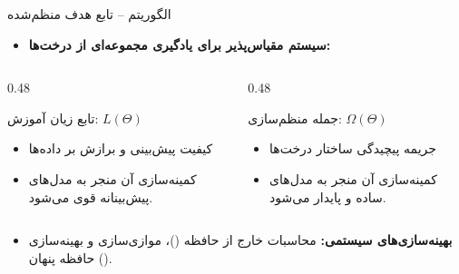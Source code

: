\begin{frame}{الگوریتم  -- تابع هدف منظم‌شده}{}
  \begin{itemize}
    \item \textbf{سیستم مقیاس‌پذیر برای یادگیری مجموعه‌ای از درخت‌ها:}
  \end{itemize}
  \vspace{0.1cm}
  \begin{center}
  \end{center}
  \vspace{0.15cm}
  \begin{columns}[T]
    \begin{column}{0.48\textwidth}
      \begin{block}{تابع زیان آموزش: $L(\Theta)$}
        \begin{itemize}
          \setlength{\itemsep}{3pt}
          \item کیفیت پیش‌بینی و برازش بر داده‌ها
          \item کمینه‌سازی آن منجر به مدل‌های پیش‌بینانه قوی می‌شود.
        \end{itemize}
      \end{block}
    \end{column}
    \begin{column}{0.48\textwidth}
      \begin{block}{جمله منظم‌سازی: $\Omega(\Theta)$}
        \begin{itemize}
          \setlength{\itemsep}{3pt}
          \item جریمه پیچیدگی ساختار درخت‌ها
          \item کمینه‌سازی آن منجر به مدل‌های ساده و پایدار می‌شود.
        \end{itemize}
      \end{block}
    \end{column}
  \end{columns}
  \vspace{0.1cm}
  \begin{itemize}
    \item \textbf{بهینه‌سازی‌های سیستمی:} محاسبات خارج از حافظه ()، موازی‌سازی و بهینه‌سازی حافظه پنهان ().
  \end{itemize}
\end{frame}

